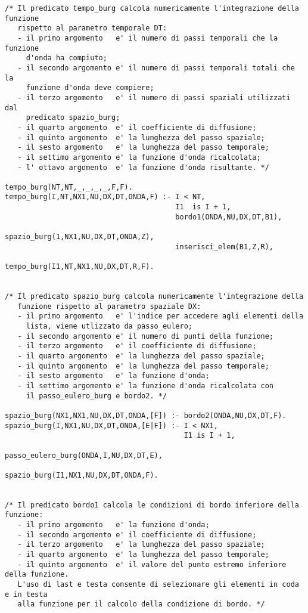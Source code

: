 \begin{verbatim}
/* Il predicato tempo_burg calcola numericamente l'integrazione della funzione 
   rispetto al parametro temporale DT:
   - il primo argomento   e' il numero di passi temporali che la funzione
     d'onda ha compiuto;
   - il secondo argomento e' il numero di passi temporali totali che la
     funzione d'onda deve compiere; 
   - il terzo argomento   e' il numero di passi spaziali utilizzati dal
     predicato spazio_burg;
   - il quarto argomento  e' il coefficiente di diffusione;         
   - il quinto argomento  e' la lunghezza del passo spaziale;
   - il sesto argomento   e' la lunghezza del passo temporale;
   - il settimo argomento e' la funzione d'onda ricalcolata;
   - l' ottavo argomento  e' la funzione d'onda risultante. */

tempo_burg(NT,NT,_,_,_,_,F,F).
tempo_burg(I,NT,NX1,NU,DX,DT,ONDA,F) :- I < NT,
                                        I1  is I + 1,
                                        bordo1(ONDA,NU,DX,DT,B1),
                                        spazio_burg(1,NX1,NU,DX,DT,ONDA,Z),
                                        inserisci_elem(B1,Z,R),
                                        tempo_burg(I1,NT,NX1,NU,DX,DT,R,F).


/* Il predicato spazio_burg calcola numericamente l'integrazione della
   funzione rispetto al parametro spaziale DX:
   - il primo argomento   e' l'indice per accedere agli elementi della 
     lista, viene utlizzato da passo_eulero; 
   - il secondo argomento e' il numero di punti della funzione; 
   - il terzo argomento   e' il coefficiente di diffusione;  
   - il quarto argomento  e' la lunghezza del passo spaziale;
   - il quinto argomento  e' la lunghezza del passo temporale;
   - il sesto argomento   e' la funzione d'onda;
   - il settimo argomento e' la funzione d'onda ricalcolata con 
     il passo_eulero_burg e bordo2. */

spazio_burg(NX1,NX1,NU,DX,DT,ONDA,[F]) :- bordo2(ONDA,NU,DX,DT,F).
spazio_burg(I,NX1,NU,DX,DT,ONDA,[E|F]) :- I < NX1,
                                          I1 is I + 1,
                                          passo_eulero_burg(ONDA,I,NU,DX,DT,E),
                                          spazio_burg(I1,NX1,NU,DX,DT,ONDA,F).


/* Il predicato bordo1 calcola le condizioni di bordo inferiore della funzione:
   - il primo argomento   e' la funzione d'onda;
   - il secondo argomento e' il coefficiente di diffusione;
   - il terzo argomento   e' la lunghezza del passo spaziale;
   - il quarto argomento  e' la lunghezza del passo temporale;
   - il quinto argomento  e' il valore del punto estremo inferiore della funzione.
   L'uso di last e testa consente di selezionare gli elementi in coda e in testa
   alla funzione per il calcolo della condizione di bordo. */


\end{verbatim}
